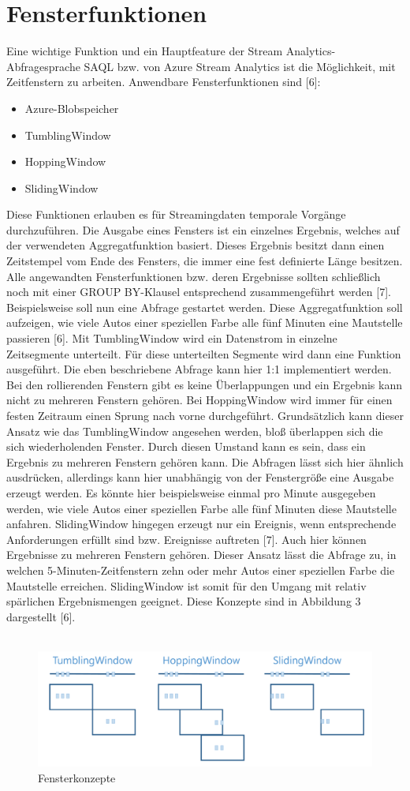 \section{Fensterfunktionen}
Eine wichtige Funktion und ein Hauptfeature der Stream Analytics-Abfragesprache SAQL bzw. von Azure Stream Analytics ist die Möglichkeit, mit Zeitfenstern zu arbeiten. Anwendbare Fensterfunktionen sind [6]:
\begin{itemize}
\item Azure-Blobspeicher 
\item TumblingWindow
\item HoppingWindow
\item SlidingWindow
\end{itemize}
Diese Funktionen erlauben es für Streamingdaten temporale Vorgänge durchzuführen. Die Ausgabe eines Fensters ist ein einzelnes Ergebnis, welches auf der verwendeten Aggregatfunktion basiert. Dieses Ergebnis besitzt dann einen Zeitstempel vom Ende des Fensters, die immer eine fest definierte Länge besitzen. Alle angewandten Fensterfunktionen bzw. deren Ergebnisse sollten schließlich noch mit einer GROUP BY-Klausel entsprechend zusammengeführt werden [7]. 
Beispielsweise soll nun eine Abfrage gestartet werden. Diese Aggregatfunktion soll aufzeigen, wie viele Autos einer speziellen Farbe alle fünf Minuten eine Mautstelle passieren [6]. Mit TumblingWindow wird ein Datenstrom in einzelne Zeitsegmente unterteilt. Für diese unterteilten Segmente wird dann eine Funktion ausgeführt. Die eben beschriebene Abfrage kann hier 1:1 implementiert werden. Bei den rollierenden Fenstern gibt es keine Überlappungen und ein Ergebnis kann nicht zu mehreren Fenstern gehören. Bei HoppingWindow wird immer für einen festen Zeitraum einen Sprung nach vorne durchgeführt. Grundsätzlich kann dieser Ansatz wie das TumblingWindow angesehen werden, bloß überlappen sich die sich wiederholenden Fenster. Durch diesen Umstand kann es sein, dass ein Ergebnis zu mehreren Fenstern gehören kann. Die Abfragen lässt sich hier ähnlich ausdrücken, allerdings kann hier unabhängig von der Fenstergröße eine Ausgabe erzeugt werden. Es könnte hier beispielsweise einmal pro Minute ausgegeben werden, wie viele Autos einer speziellen Farbe alle fünf Minuten diese Mautstelle anfahren. SlidingWindow hingegen erzeugt nur ein Ereignis, wenn entsprechende Anforderungen erfüllt sind bzw. Ereignisse auftreten [7]. Auch hier können Ergebnisse zu mehreren Fenstern gehören. Dieser Ansatz lässt die Abfrage zu, in welchen 5-Minuten-Zeitfenstern zehn oder mehr Autos einer speziellen Farbe die Mautstelle erreichen. SlidingWindow ist somit für den Umgang mit relativ spärlichen Ergebnismengen geeignet. Diese Konzepte sind in Abbildung 3 dargestellt [6].
\\ \\

\begin{figure}[h!]
	\centering
	\includegraphics[width=1.0\linewidth]{images/fensterfunktionen}
	\caption{Fensterkonzepte} %
	\label{fig:window_concepts}
\end{figure}
